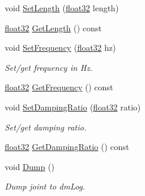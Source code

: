 \begin{DoxyCompactItemize}
void \mbox{\hyperlink{classb2_distance_joint_a950a0f187ef691208e50de40ed9223fe}{Set\+Length}} (\mbox{\hyperlink{b2_settings_8h_aacdc525d6f7bddb3ae95d5c311bd06a1}{float32}} length)
\item 
\mbox{\hyperlink{b2_settings_8h_aacdc525d6f7bddb3ae95d5c311bd06a1}{float32}} \mbox{\hyperlink{classb2_distance_joint_a7a4d8845e54abb6f8695ff6b3c78f9f9}{Get\+Length}} () const
\item 
void \mbox{\hyperlink{classb2_distance_joint_a1a12446f8926a1324edd481d9cd28c8a}{Set\+Frequency}} (\mbox{\hyperlink{b2_settings_8h_aacdc525d6f7bddb3ae95d5c311bd06a1}{float32}} hz)
\begin{DoxyCompactList}\small\item\em Set/get frequency in Hz. \end{DoxyCompactList}\item 
\mbox{\hyperlink{b2_settings_8h_aacdc525d6f7bddb3ae95d5c311bd06a1}{float32}} \mbox{\hyperlink{classb2_distance_joint_a9f7bfb48940bbc8dbef27600e327a739}{Get\+Frequency}} () const
\item 
void \mbox{\hyperlink{classb2_distance_joint_a58da61301a1f1398a715107b76649923}{Set\+Damping\+Ratio}} (\mbox{\hyperlink{b2_settings_8h_aacdc525d6f7bddb3ae95d5c311bd06a1}{float32}} ratio)
\begin{DoxyCompactList}\small\item\em Set/get damping ratio. \end{DoxyCompactList}\item 
\mbox{\hyperlink{b2_settings_8h_aacdc525d6f7bddb3ae95d5c311bd06a1}{float32}} \mbox{\hyperlink{classb2_distance_joint_a5c8ee3cfcadc356b957d71582b720056}{Get\+Damping\+Ratio}} () const
\item 
void \mbox{\hyperlink{classb2_distance_joint_a3cebcc6ccce6f3c24432cd130fd53517}{Dump}} ()
\begin{DoxyCompactList}\small\item\em Dump joint to dm\+Log. \end{DoxyCompactList}\end{DoxyCompactItemize}
